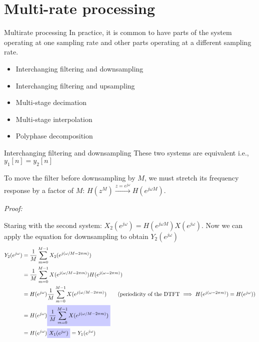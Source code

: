 \documentclass[10pt, aspectratio=169]{beamer}
\begin{document}
% 
\section{Multi-rate processing}
\begin{frame}{Multirate processing}
	In practice, it is common to have parts of the system operating at one sampling rate and other parts operating at a different sampling rate.
	\begin{itemize}
		\item Interchanging filtering and downsampling
		\item Interchanging filtering and upsampling
		\item Multi-stage decimation
		\item Multi-stage interpolation
		\item Polyphase decomposition
	\end{itemize}

\end{frame}

\begin{frame}{Interchanging filtering and downsampling}
	These two systems are equivalent i.e., $y_1[n] = y_2[n]$
	\begin{center}
		\resizebox{0.6\linewidth}{!}{}
	\end{center}	

	To move the filter before downsampling by $M$, we must stretch its frequency response by a factor of $M$: $H(z^M) \xrightarrow{z = e^{j\omega}} H(e^{j\omega M})$.
\end{frame}

\begin{frame}
	\textit{Proof:}
	
	Staring with the second system: $X_2(e^{j\omega}) = H(e^{j\omega M})X(e^{j\omega})$. Now we can apply the equation for downsampling to obtain $Y_2(e^{j\omega})$
	\begin{align*}
	Y_2(e^{j\omega}) &= \frac{1}{M}\sum_{m= 0}^{M-1} X_2(e^{j(\omega/M - 2\pi m)}) \\
	&=\frac{1}{M}\sum_{m= 0}^{M-1} X(e^{j(\omega/M - 2\pi m)})H(e^{j(\omega - 2\pi m)}) \\
	&=H(e^{j\omega})\frac{1}{M}\sum_{m= 0}^{M-1} X(e^{j(\omega/M - 2\pi m)}) \tag{periodicity of the DTFT $\implies H(e^{j(\omega - 2\pi m)}) = H(e^{j\omega})$} \\
	&=H(e^{j\omega})\tikz[baseline]{\node[fill=blue!20,anchor=base] {$\displaystyle\frac{1}{M}\sum_{m= 0}^{M-1} X(e^{j(\omega/M - 2\pi m)})$};} \\
	&=H(e^{j\omega})\tikz[baseline]{\node[fill=blue!20,anchor=base] {$X_1(e^{j\omega})$};} = Y_1(e^{j\omega})
	\end{align*}
\end{frame}
\end{document}
